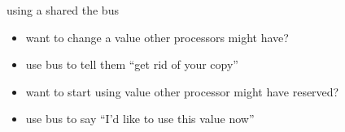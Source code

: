 \begin{frame}{using a shared the bus}
\begin{itemize}
\item want to change a value other processors might have?
\item use bus to tell them ``get rid of your copy''
\vspace{.5cm}
\item want to start using value other processor might have reserved?
\item use bus to say ``I'd like to use this value now''
\end{itemize}
\end{frame}
